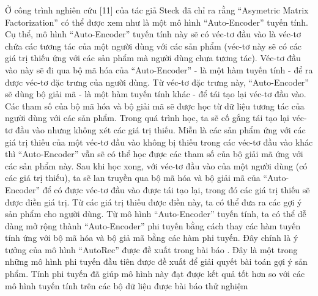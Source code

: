 Ở công trình nghiên cứu [11] của tác giả Steck đã chỉ ra rằng “Asymetric Matrix Factorization” có thể được xem như là một mô hình “Auto-Encoder” tuyến tính. 
Cụ thể, mô hình ``Auto-Encoder'' tuyến tính này sẽ có véc-tơ đầu vào là véc-tơ chứa các tương tác của một người dùng với các sản phẩm (véc-tơ này sẽ có các giá trị thiếu ứng với các sản phẩm mà người dùng chưa tương tác). 
Véc-tơ đầu vào này sẽ đi qua bộ mã hóa của ``Auto-Encoder'' - là một hàm tuyến tính - để ra được véc-tơ đặc trưng của người dùng. 
Từ véc-tơ đặc trưng này, ``Auto-Encoder'' sẽ dùng bộ giải mã - là một hàm tuyến tính khác - để tái tạo lại véc-tơ đầu vào. 
Các tham số của bộ mã hóa và bộ giải mã sẽ được học từ dữ liệu tương tác của người dùng với các sản phẩm. 
Trong quá trình học, ta sẽ cố gắng tái tạo lại véc-tơ đầu vào nhưng không xét các giá trị thiếu. 
Miễn là các sản phẩm ứng với các giá trị thiếu của một véc-tơ đầu vào không bị thiếu trong các véc-tơ đầu vào khác thì ``Auto-Encoder'' vẫn sẽ có thể học được các tham số của bộ giải mã ứng với các sản phẩm này. 
Sau khi học xong, với véc-tơ đầu vào của một người dùng (có các giá trị thiếu), ta sẽ lan truyền qua bộ mã hóa và bộ giải mã của ``Auto-Encoder'' để có được véc-tơ đầu vào được tái tạo lại, trong đó các giá trị thiếu sẽ được điền giá trị. 
Từ các giá trị thiếu được điền này, ta có thể đưa ra các gợi ý sản phẩm cho người dùng. 
Từ mô hình ``Auto-Encoder'' tuyến tính, ta có thể dễ dàng mở rộng thành ``Auto-Encoder'' phi tuyến bằng cách thay các hàm tuyến tính ứng với bộ mã hóa và bộ giả mã bằng các hàm phi tuyến. 
Đây chính là ý tưởng của mô hình ``AutoRec'' được đề xuất trong bài báo \cite{autorec}. 
Đây là một trong những mô hình phi tuyến đầu tiên được đề xuất để giải quyết bài toán gợi ý sản phẩm. 
Tính phi tuyến đã giúp mô hình này đạt được kết quả tốt hơn so với các mô hình tuyến tính trên các bộ dữ liệu được bài báo thử nghiệm


